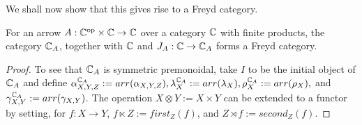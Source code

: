 We shall now show that this gives rise to a Freyd category.

\begin{lemma}
    For an arrow $A : {\mathbb{C}}^{\text{op}} \times \mathbb{C} \to \mathbb{C}$ over a category
    $\mathbb{C}$ with finite products, the category $\mathbb{C}_A$, together with $\mathbb{C}$
    and $J_A : \mathbb{C} \to \mathbb{C}_A$ forms a Freyd category.
\end{lemma}

\begin{proof}
    To see that $\mathbb{C}_A$ is symmetric premonoidal, take $I$ to be the initial
    object of $\mathbb{C}_A$ and define $\alpha_{X, Y, Z}^{\mathbb{C}_A} := arr(\alpha_{X,
    Y, Z}), \lambda^{\mathbb{C}_A}_X := arr(\lambda_X), \rho^{\mathbb{C}_A}_X :=
    arr(\rho_X),$ and $\gamma^{\mathbb{C}_A}_{X, Y} := arr(\gamma_{X, Y})$. The
    operation $X \otimes Y := X \times Y$ can be extended to a functor by
    setting, for $f: X \to Y$, $f \ltimes Z := first_Z(f)$, and $Z \rtimes f :=
    second_Z(f)$.


\end{proof}

